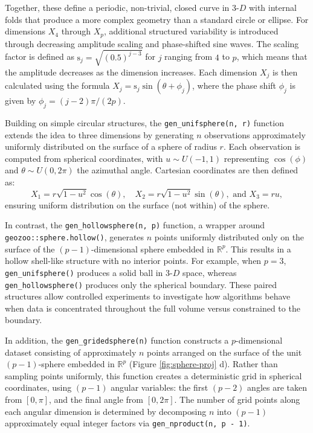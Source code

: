 Together, these define a periodic, non-trivial, closed curve in \(3\text{-}D\) with internal folds that produce a more complex geometry than a standard circle or ellipse. For dimensions \(X_4\) through \(X_p\), additional structured variability is introduced through decreasing amplitude scaling and phase-shifted sine waves. The scaling factor is defined as \(\text{s}_j = \sqrt{(0.5)^{j-3}}\) for \(j\) ranging from \(4\) to \(p\), which means that the amplitude decreases as the dimension increases. Each dimension \(X_j\) is then calculated using the formula \(X_j = \text{s}_j\sin(\theta + \phi_j)\), where the phase shift \(\phi_j\) is given by \(\phi_j = (j - 2)\pi/(2p)\).

Building on simple circular structures, the \texttt{gen\_unifsphere(n,\ r)} function extends the idea to three dimensions by generating \(n\) observations approximately uniformly distributed on the surface of a sphere of radius \(r\). Each observation is computed from spherical coordinates, with \(u \sim U(-1, 1)\) representing \(\cos(\phi)\) and \(\theta \sim U(0, 2\pi)\) the azimuthal angle. Cartesian coordinates are then defined as: \[X_1 = r\sqrt{1 - u^2}\cos(\theta), \quad X_2 = r\sqrt{1 - u^2}\sin(\theta),\text{ and }X_3 = ru,\] ensuring uniform distribution on the surface (not within) of the sphere.

In contrast, the \texttt{gen\_hollowsphere(n,\ p)} function, a wrapper around \texttt{geozoo::sphere.hollow()}, generates \(n\) points uniformly distributed only on the surface of the \((p-1)\)-dimensional sphere embedded in \(\mathbb{R}^p\). This results in a hollow shell-like structure with no interior points. For example, when \(p=3\), \texttt{gen\_unifsphere()} produces a solid ball in \(3\text{-}D\) space, whereas \texttt{gen\_hollowsphere()} produces only the spherical boundary. These paired structures allow controlled experiments to investigate how algorithms behave when data is concentrated throughout the full volume versus constrained to the boundary.

In addition, the \texttt{gen\_gridedsphere(n)} function constructs a \(p\)-dimensional dataset consisting of approximately \(n\) points arranged on the surface of the unit \((p-1)\)-sphere embedded in \(\mathbb{R}^p\) (Figure \ref{fig:sphere-proj} d). Rather than sampling points uniformly, this function creates a deterministic grid in spherical coordinates, using \((p-1)\) angular variables: the first \((p-2)\) angles are taken from \([0, \pi]\), and the final angle from \([0, 2\pi]\). The number of grid points along each angular dimension is determined by decomposing \(n\) into \((p-1)\) approximately equal integer factors via \texttt{gen\_nproduct(n,\ p\ -\ 1)}.

